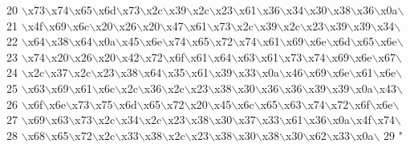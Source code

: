 \begin{DoxyCode}
20 \textcolor{stringliteral}{\(\backslash\)x73\(\backslash\)x74\(\backslash\)x65\(\backslash\)x6d\(\backslash\)x73\(\backslash\)x2c\(\backslash\)x39\(\backslash\)x2c\(\backslash\)x23\(\backslash\)x61\(\backslash\)x36\(\backslash\)x34\(\backslash\)x30\(\backslash\)x38\(\backslash\)x36\(\backslash\)x0a\(\backslash\)}
21 \textcolor{stringliteral}{\(\backslash\)x4f\(\backslash\)x69\(\backslash\)x6c\(\backslash\)x20\(\backslash\)x26\(\backslash\)x20\(\backslash\)x47\(\backslash\)x61\(\backslash\)x73\(\backslash\)x2c\(\backslash\)x39\(\backslash\)x2c\(\backslash\)x23\(\backslash\)x39\(\backslash\)x39\(\backslash\)x34\(\backslash\)}
22 \textcolor{stringliteral}{\(\backslash\)x64\(\backslash\)x38\(\backslash\)x64\(\backslash\)x0a\(\backslash\)x45\(\backslash\)x6e\(\backslash\)x74\(\backslash\)x65\(\backslash\)x72\(\backslash\)x74\(\backslash\)x61\(\backslash\)x69\(\backslash\)x6e\(\backslash\)x6d\(\backslash\)x65\(\backslash\)x6e\(\backslash\)}
23 \textcolor{stringliteral}{\(\backslash\)x74\(\backslash\)x20\(\backslash\)x26\(\backslash\)x20\(\backslash\)x42\(\backslash\)x72\(\backslash\)x6f\(\backslash\)x61\(\backslash\)x64\(\backslash\)x63\(\backslash\)x61\(\backslash\)x73\(\backslash\)x74\(\backslash\)x69\(\backslash\)x6e\(\backslash\)x67\(\backslash\)}
24 \textcolor{stringliteral}{\(\backslash\)x2c\(\backslash\)x37\(\backslash\)x2c\(\backslash\)x23\(\backslash\)x38\(\backslash\)x64\(\backslash\)x35\(\backslash\)x61\(\backslash\)x39\(\backslash\)x33\(\backslash\)x0a\(\backslash\)x46\(\backslash\)x69\(\backslash\)x6e\(\backslash\)x61\(\backslash\)x6e\(\backslash\)}
25 \textcolor{stringliteral}{\(\backslash\)x63\(\backslash\)x69\(\backslash\)x61\(\backslash\)x6c\(\backslash\)x2c\(\backslash\)x36\(\backslash\)x2c\(\backslash\)x23\(\backslash\)x38\(\backslash\)x30\(\backslash\)x36\(\backslash\)x36\(\backslash\)x39\(\backslash\)x39\(\backslash\)x0a\(\backslash\)x43\(\backslash\)}
26 \textcolor{stringliteral}{\(\backslash\)x6f\(\backslash\)x6e\(\backslash\)x73\(\backslash\)x75\(\backslash\)x6d\(\backslash\)x65\(\backslash\)x72\(\backslash\)x20\(\backslash\)x45\(\backslash\)x6c\(\backslash\)x65\(\backslash\)x63\(\backslash\)x74\(\backslash\)x72\(\backslash\)x6f\(\backslash\)x6e\(\backslash\)}
27 \textcolor{stringliteral}{\(\backslash\)x69\(\backslash\)x63\(\backslash\)x73\(\backslash\)x2c\(\backslash\)x34\(\backslash\)x2c\(\backslash\)x23\(\backslash\)x38\(\backslash\)x30\(\backslash\)x37\(\backslash\)x33\(\backslash\)x61\(\backslash\)x36\(\backslash\)x0a\(\backslash\)x4f\(\backslash\)x74\(\backslash\)}
28 \textcolor{stringliteral}{\(\backslash\)x68\(\backslash\)x65\(\backslash\)x72\(\backslash\)x2c\(\backslash\)x33\(\backslash\)x38\(\backslash\)x2c\(\backslash\)x23\(\backslash\)x38\(\backslash\)x30\(\backslash\)x38\(\backslash\)x30\(\backslash\)x62\(\backslash\)x33\(\backslash\)x0a\(\backslash\)}
29 \textcolor{stringliteral}{"}
\end{DoxyCode}
\hypertarget{namespacechart__rc2_ae49c6c413c1c35802bbd8edfeffc699a}{}
